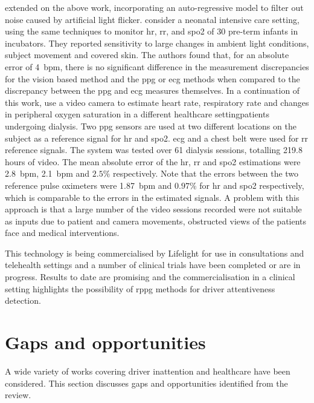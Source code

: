 \documentclass[11pt, parskip=half*,twoside=false]{scrbook}
\begin{document}
{\citet{tarassenkoNoncontactVideobasedVital2014} extended on the above work, incorporating an auto-regressive model to filter out noise caused by artificial light flicker. \citet{villarroelContinuousNoncontactVital2014} consider a  neonatal intensive care setting, using the same techniques to monitor \gls{hr}, \gls{rr}, and \gls{spo2} of 30 pre-term infants in incubators. They reported sensitivity to large changes in ambient light conditions, subject movement and covered skin. The authors found that, for an absolute error of 4~\gls{bpm}, there is no significant difference in the measurement discrepancies for the vision based method and the \gls{ppg} or \gls{ecg} methods when compared to the discrepancy between the \gls{ppg} and \gls{ecg} measures themselves. In a continuation of this work, \citet{villarroelNonContactVitalSign2017} use a video camera to estimate heart rate, respiratory rate and changes in peripheral oxygen saturation in a different healthcare setting\textemdash patients undergoing dialysis. Two \gls{ppg} sensors are used at two different locations on the subject as a reference signal for \gls{hr} and \gls{spo2}. \gls{ecg} and a chest belt were used for \gls{rr} reference signals. The system was tested over 61 dialysis sessions, totalling 219.8 hours of video. The mean absolute error of the \gls{hr}, \gls{rr} and \gls{spo2} estimations were 2.8~\gls{bpm}, 2.1~\gls{bpm} and $2.5\%$ respectively. Note that the errors between the two reference pulse oximeters were 1.87~\gls{bpm} and $0.97\%$ for \gls{hr} and \gls{spo2} respectively, which is comparable to the errors in the estimated signals.  A problem with this approach is that a large number of the video sessions recorded were not suitable as inputs due to patient and camera movements, obstructed views of the patients face and medical interventions. 

This technology is being commercialised by Lifelight \citep{ximlimitedLifelightXimLimited2021} for use in consultations and telehealth settings and a number of clinical trials have been completed or are in progress. Results to date are  promising and the commercialisation in a clinical setting highlights the possibility of \gls{rppg} methods for driver attentiveness detection.

\section{Gaps and opportunities}
A wide variety of works covering driver inattention and healthcare have been considered. This section discusses gaps and opportunities identified from the review.

}
\end{document}
